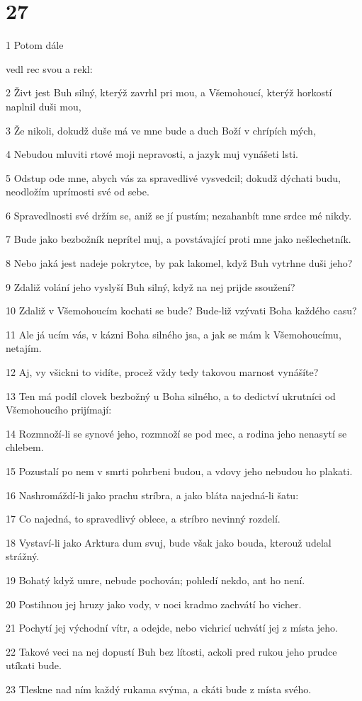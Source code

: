 \chapter{27}

\par 1 Potom dále \par vedl rec svou a rekl:
\par 2 Živt jest Buh silný, kterýž zavrhl pri mou, a Všemohoucí, kterýž horkostí naplnil duši mou,
\par 3 Že nikoli, dokudž duše má ve mne bude a duch Boží v chrípích mých,
\par 4 Nebudou mluviti rtové moji nepravosti, a jazyk muj vynášeti lsti.
\par 5 Odstup ode mne, abych vás za spravedlivé vysvedcil; dokudž dýchati budu, neodložím uprímosti své od sebe.
\par 6 Spravedlnosti své držím se, aniž se jí pustím; nezahanbít mne srdce mé nikdy.
\par 7 Bude jako bezbožník neprítel muj, a povstávající proti mne jako nešlechetník.
\par 8 Nebo jaká jest nadeje pokrytce, by pak lakomel, když Buh vytrhne duši jeho?
\par 9 Zdaliž volání jeho vyslyší Buh silný, když na nej prijde ssoužení?
\par 10 Zdaliž v Všemohoucím kochati se bude? Bude-liž vzývati Boha každého casu?
\par 11 Ale já ucím vás, v kázni Boha silného jsa, a jak se mám k Všemohoucímu, netajím.
\par 12 Aj, vy všickni to vidíte, procež vždy tedy takovou marnost vynášíte?
\par 13 Ten má podíl clovek bezbožný u Boha silného, a to dedictví ukrutníci od Všemohoucího prijímají:
\par 14 Rozmnoží-li se synové jeho, rozmnoží se pod mec, a rodina jeho nenasytí se chlebem.
\par 15 Pozustalí po nem v smrti pohrbeni budou, a vdovy jeho nebudou ho plakati.
\par 16 Nashromáždí-li jako prachu stríbra, a jako bláta najedná-li šatu:
\par 17 Co najedná, to spravedlivý oblece, a stríbro nevinný rozdelí.
\par 18 Vystaví-li jako Arktura dum svuj, bude však jako bouda, kterouž udelal strážný.
\par 19 Bohatý když umre, nebude pochován; pohledí nekdo, ant ho není.
\par 20 Postihnou jej hruzy jako vody, v noci kradmo zachvátí ho vicher.
\par 21 Pochytí jej východní vítr, a odejde, nebo vichricí uchvátí jej z místa jeho.
\par 22 Takové veci na nej dopustí Buh bez lítosti, ackoli pred rukou jeho prudce utíkati bude.
\par 23 Tleskne nad ním každý rukama svýma, a ckáti bude z místa svého.

